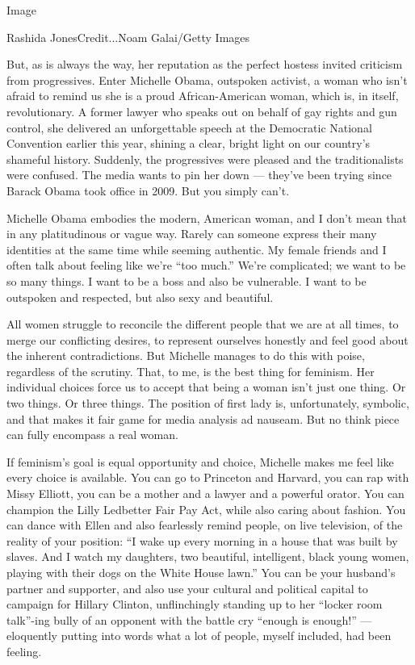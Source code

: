 Image

Rashida JonesCredit...Noam Galai/Getty Images

But, as is always the way, her reputation as the perfect hostess invited
criticism from progressives. Enter Michelle Obama, outspoken activist, a
woman who isn't afraid to remind us she is a proud African-American
woman, which is, in itself, revolutionary. A former lawyer who speaks
out on behalf of gay rights and gun control, she delivered an
unforgettable speech at the Democratic National Convention earlier this
year, shining a clear, bright light on our country's shameful history.
Suddenly, the progressives were pleased and the traditionalists were
confused. The media wants to pin her down --- they've been trying since
Barack Obama took office in 2009. But you simply can't.

Michelle Obama embodies the modern, American woman, and I don't mean
that in any platitudinous or vague way. Rarely can someone express their
many identities at the same time while seeming authentic. My female
friends and I often talk about feeling like we're ``too much.'' We're
complicated; we want to be so many things. I want to be a boss and also
be vulnerable. I want to be outspoken and respected, but also sexy and
beautiful.

All women struggle to reconcile the different people that we are at all
times, to merge our conflicting desires, to represent ourselves honestly
and feel good about the inherent contradictions. But Michelle manages to
do this with poise, regardless of the scrutiny. That, to me, is the best
thing for feminism. Her individual choices force us to accept that being
a woman isn't just one thing. Or two things. Or three things. The
position of first lady is, unfortunately, symbolic, and that makes it
fair game for media analysis ad nauseam. But no think piece can fully
encompass a real woman.

If feminism's goal is equal opportunity and choice, Michelle makes me
feel like every choice is available. You can go to Princeton and
Harvard, you can rap with Missy Elliott, you can be a mother and a
lawyer and a powerful orator. You can champion the Lilly Ledbetter Fair
Pay Act, while also caring about fashion. You can dance with Ellen and
also fearlessly remind people, on live television, of the reality of
your position: ``I wake up every morning in a house that was built by
slaves. And I watch my daughters, two beautiful, intelligent, black
young women, playing with their dogs on the White House lawn.'' You can
be your husband's partner and supporter, and also use your cultural and
political capital to campaign for Hillary Clinton, unflinchingly
standing up to her ``locker room talk''-ing bully of an opponent with
the battle cry ``enough is enough!'' --- eloquently putting into words
what a lot of people, myself included, had been feeling.

